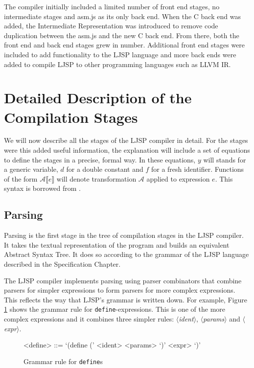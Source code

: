 \documentclass[11pt]{report}
\begin{document}
The compiler initially included a limited number of front end stages, no intermediate stages and asm.js as its only back end. When the C back end was added, the Intermediate Representation was introduced to remove code duplication between the asm.js and the new C back end. From there, both the front end and back end stages grew in number. Additional front end stages were included to add functionality to the LJSP language and more back ends were added to compile LJSP to other programming languages such as LLVM IR. 

\section{Detailed Description of the Compilation Stages}
We will now describe all the stages of the LJSP compiler in detail. For the stages were this added useful information, the explanation will include a set of equations to define the stages in a precise, formal way. In these equations, $y$ will stands for a generic variable, $d$ for a double constant and $f$ for a fresh identifier. Functions of the form $\mathcal{A}\llbracket e \rrbracket$ will denote transformation $\mathcal{A}$ applied to expression $e$. This syntax is borrowed from \cite{Morrisett:1999:SFT:319301.319345}.

\subsection{Parsing}
Parsing is the first stage in the tree of compilation stages in the LJSP compiler. It takes the textual representation of the program and builds an equivalent Abstract Syntax Tree. It does so according to the grammar of the LJSP language described in the Specification Chapter.

The LJSP compiler implements parsing using parser combinators that combine parsers for simpler expressions to form parsers for more complex expressions. This reflects the way that LJSP's grammar is written down. For example, Figure \ref{grammardefine} shows the grammar rule for \texttt{define}-expressions. This is one of the more complex expressions and it combines three simpler rules: \textit{$\langle$ident$\rangle$}, \textit{$\langle$params$\rangle$} and \textit{$\langle$expr$\rangle$}.
\begin{figure}[ht]
\begin{grammar}
<define> ::= `(define (' <ident> <params> `)' <expr> `)'
\end{grammar}
\caption{Grammar rule for \texttt{define}s}
\label{grammardefine}
\end{figure}
\end{document}
